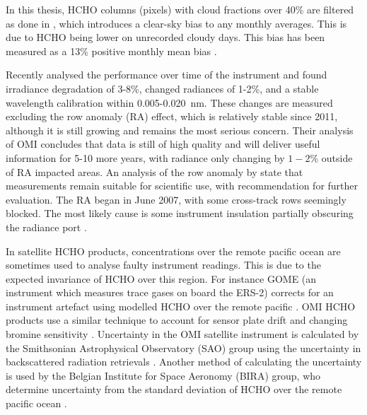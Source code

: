     In this thesis, HCHO columns (pixels) with cloud fractions over 40\% are filtered as done in \textcite{Palmer2001}, which introduces a clear-sky bias to any monthly averages.
    This is due to HCHO being lower on unrecorded cloudy days.
    This bias has been measured as a 13\% positive monthly mean bias \parencite{Palmer2001, Surl2018}.
    
    
    Recently \textcite{Schenkeveld2017} analysed the performance over time of the instrument and found irradiance degradation of 3-8\%, changed radiances of 1-2\%, and a stable wavelength calibration within 0.005-0.020~nm.
    These changes are measured excluding the row anomaly (RA) effect, which is relatively stable since 2011, although it is still growing and remains the most serious concern.
    Their analysis of OMI concludes that data is still of high quality and will deliver useful information for 5-10 more years, with radiance only changing by $1-2\%$ outside of RA impacted areas.
    An analysis of the row anomaly by \textcite{Huang2017} state that measurements remain suitable for scientific use, with recommendation for further evaluation.
    The RA began in June 2007, with some cross-track rows seemingly blocked. 
    The most likely cause is some instrument insulation partially obscuring the radiance port \parencite{Schenkeveld2017}.
    
    In satellite HCHO products, concentrations over the remote pacific ocean are sometimes used to analyse faulty instrument readings.
    This is due to the expected invariance of HCHO over this region.
    For instance GOME (an instrument which measures trace gases on board the ERS-2) corrects for an instrument artefact using modelled HCHO over the remote pacific \parencite{Shim2005}.
    OMI HCHO products use a similar technique to account for sensor plate drift and changing bromine sensitivity \parencite{Abad2015}.
    Uncertainty in the OMI satellite instrument is calculated by the Smithsonian Astrophysical Observatory (SAO) group using the uncertainty in backscattered radiation retrievals \parencite{Abad2015, Abad2016}.
    Another method of calculating the uncertainty is used by the Belgian Institute for Space Aeronomy (BIRA) group, who determine uncertainty from the standard deviation of HCHO over the remote pacific ocean \parencite{DeSmedt2012, DeSmedt2015}.
    
